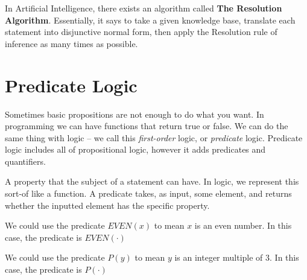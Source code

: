\documentclass[main.tex]{subfiles}
\begin{document}
In Artificial Intelligence, there exists an algorithm called \textbf{The Resolution Algorithm}. Essentially, it says to take a given knowledge base, translate each statement into disjunctive normal form, then apply the Resolution rule of inference as many times as possible.

\section{Predicate Logic}

Sometimes basic propositions are not enough to do what you want. In programming we can have functions that return true or false. We can do the same thing with logic -- we call this \textit{first-order} logic, or \textit{predicate} logic. Predicate logic includes all of propositional logic, however it adds predicates and quantifiers.

\begin{defn}
	A property that the subject of a statement can have. In logic, we represent this sort-of like a function. A predicate takes, as input, some element, and returns whether the inputted element has the specific property.
\end{defn}

\begin{example}
	We could use the predicate \(EVEN(x)\) to mean \(x\) is an even number. In this case, the predicate is \(EVEN(\cdot)\)
\end{example}

\begin{example}
	We could use the predicate \(P(y)\) to mean \(y\) is an integer multiple of 3. In this case, the predicate is \(P(\cdot)\)
\end{example}
\end{document}
